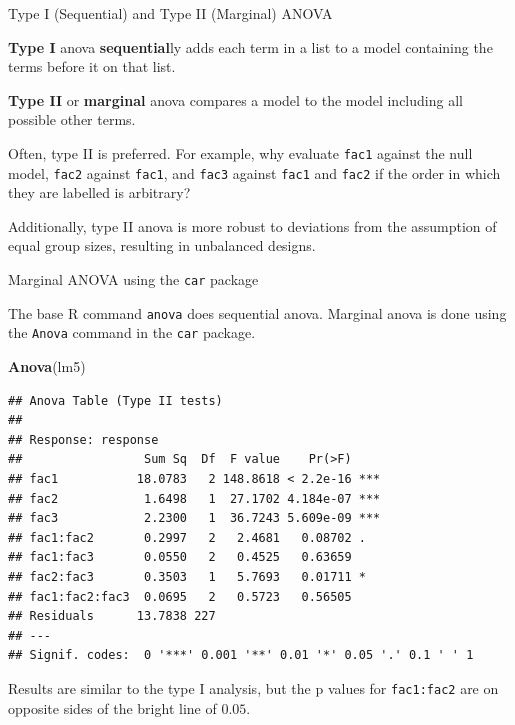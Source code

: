 \documentclass[
  ignorenonframetext,
]{beamer}
\newenvironment{Shaded}{\begin{snugshade}}{\end{snugshade}}
\newcommand{\KeywordTok}[1]{\textcolor[rgb]{0.13,0.29,0.53}{\textbf{#1}}}
\newcommand{\NormalTok}[1]{#1}
\begin{document}
\begin{frame}[fragile]{Type I (Sequential) and Type II (Marginal) ANOVA}
\protect\hypertarget{type-i-sequential-and-type-ii-marginal-anova}{}

\textbf{Type I} anova \textbf{sequential}ly adds each term in a list to
a model containing the terms before it on that list.

\textbf{Type II} or \textbf{marginal} anova compares a model to the
model including all possible other terms.

Often, type II is preferred. For example, why evaluate \texttt{fac1}
against the null model, \texttt{fac2} against \texttt{fac1}, and
\texttt{fac3} against \texttt{fac1} and \texttt{fac2} if the order in
which they are labelled is arbitrary?

Additionally, type II anova is more robust to deviations from the
assumption of equal group sizes, resulting in unbalanced designs.

\end{frame}

\begin{frame}[fragile]{Marginal ANOVA using the \texttt{car} package}
\protect\hypertarget{marginal-anova-using-the-car-package}{}

The base R command \texttt{anova} does sequential anova. Marginal anova
is done using the \texttt{Anova} command in the \texttt{car} package.

\scriptsize

\begin{Shaded}
\begin{Highlighting}[]
\KeywordTok{Anova}\NormalTok{(lm5)}
\end{Highlighting}
\end{Shaded}

\begin{verbatim}
## Anova Table (Type II tests)
## 
## Response: response
##                 Sum Sq  Df  F value    Pr(>F)    
## fac1           18.0783   2 148.8618 < 2.2e-16 ***
## fac2            1.6498   1  27.1702 4.184e-07 ***
## fac3            2.2300   1  36.7243 5.609e-09 ***
## fac1:fac2       0.2997   2   2.4681   0.08702 .  
## fac1:fac3       0.0550   2   0.4525   0.63659    
## fac2:fac3       0.3503   1   5.7693   0.01711 *  
## fac1:fac2:fac3  0.0695   2   0.5723   0.56505    
## Residuals      13.7838 227                       
## ---
## Signif. codes:  0 '***' 0.001 '**' 0.01 '*' 0.05 '.' 0.1 ' ' 1
\end{verbatim}

\normalsize

Results are similar to the type I analysis, but the p values for
\texttt{fac1:fac2} are on opposite sides of the bright line of \(0.05\).

\end{frame}
\end{document}
